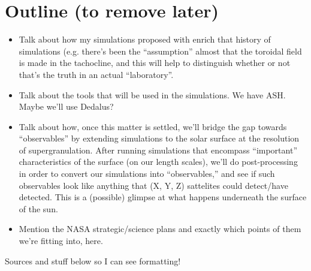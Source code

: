 \documentclass[aasms,12pt]{article}
\begin{document}
\section{Outline (to remove later)}
\begin{itemize}
\item Talk about how my simulations proposed with enrich that history of
        simulations (e.g. there's been the ``assumption'' almost that the
        toroidal field is made in the tachocline, and this will help to distinguish
        whether or not that's the truth in an actual ``laboratory''.
\item Talk about the tools that will be used in the simulations.  We have ASH.
        Maybe we'll use Dedalus?
\item Talk about how, once this matter is settled, we'll bridge the gap towards
        ``observables'' by extending simulations to the solar surface at the
        resolution of supergranulation.  After running simulations that encompass
        ``important'' characteristics of the surface (on our length scales),
        we'll do post-processing in order to convert our simulations into
        ``observables,'' and see if such observables look like anything that
        (X, Y, Z) sattelites could detect/have detected.  This is a (possible)
        glimpse at what happens underneath the surface of the sun.
\item Mention the NASA strategic/science plans and exactly which points of them
        we're fitting into, here.
\end{itemize}



Sources and stuff below so I can see formatting!


\nocite{*}

\begingroup
\renewcommand{\section}[2]{}%
\begin{footnotesize}

\end{footnotesize}
\endgroup
\end{document}
